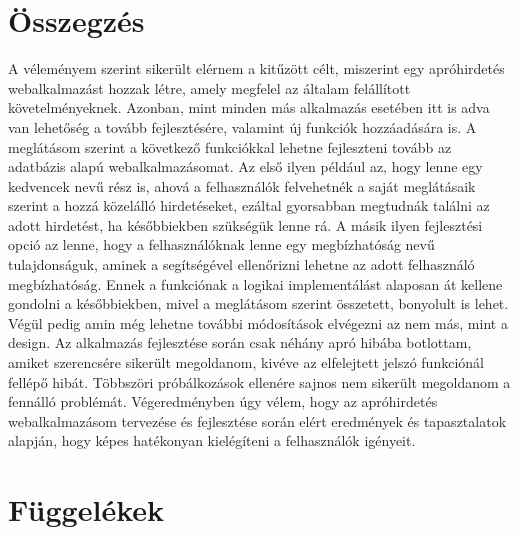\documentclass[]{thesis-ekf}
\theoremstyle{definition}
\theoremstyle{remark}
\begin{document}
	\chapter*{Összegzés}
		A véleményem szerint sikerült elérnem a kitűzött célt, miszerint egy apróhirdetés webalkalmazást hozzak létre, amely megfelel az általam felállított követelményeknek. Azonban, mint minden más alkalmazás esetében itt is adva van lehetőség a tovább fejlesztésére, valamint új funkciók hozzáadására is. A meglátásom szerint a következő funkciókkal lehetne fejleszteni tovább az adatbázis alapú webalkalmazásomat. Az első ilyen például az, hogy lenne egy kedvencek nevű rész is, ahová a felhasználók felvehetnék a saját meglátásaik szerint a hozzá közelálló hirdetéseket, ezáltal gyorsabban megtudnák találni az adott hirdetést, ha későbbiekben szükségük lenne rá. A másik ilyen fejlesztési opció az lenne, hogy a felhasználóknak lenne egy megbízhatóság nevű tulajdonságuk, aminek a segítségével ellenőrizni lehetne az adott felhasználó megbízhatóság. Ennek a funkciónak a logikai implementálást alaposan át kellene gondolni a későbbiekben, mivel a meglátásom szerint összetett, bonyolult is lehet. Végül pedig amin még lehetne további módosítások elvégezni az nem más, mint a design. Az alkalmazás fejlesztése során csak néhány apró hibába botlottam, amiket szerencsére sikerült megoldanom, kivéve az elfelejtett jelszó funkciónál fellépő hibát. Többszöri próbálkozások ellenére sajnos nem sikerült megoldanom a fennálló problémát. Végeredményben úgy vélem, hogy az apróhirdetés webalkalmazásom tervezése és fejlesztése során elért eredmények és tapasztalatok alapján, hogy képes hatékonyan kielégíteni a felhasználók igényeit.
		
	\chapter{Függelékek}\label{ch-fugg}
\end{document}
